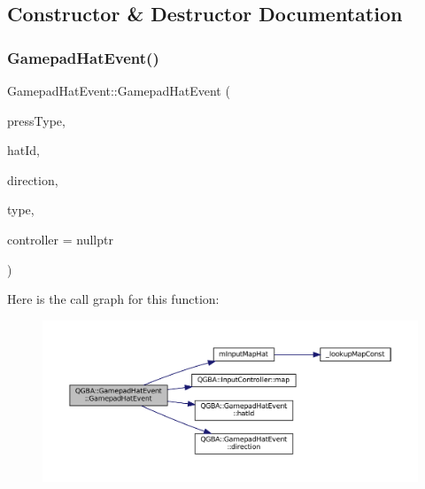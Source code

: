 \subsection{Constructor \& Destructor Documentation}
\mbox{\label{class_q_g_b_a_1_1_gamepad_hat_event_ac940e927086b56db1a2e43b79b18b47e}} 
\subsubsection{\texorpdfstring{Gamepad\+Hat\+Event()}{GamepadHatEvent()}}
{\footnotesize\ttfamily Gamepad\+Hat\+Event\+::\+Gamepad\+Hat\+Event (\begin{DoxyParamCaption}\item[{Type}]{press\+Type,  }\item[{\mbox{\hyperlink{ioapi_8h_a787fa3cf048117ba7123753c1e74fcd6}{int}}}]{hat\+Id,  }\item[{\mbox{\hyperlink{class_q_g_b_a_1_1_gamepad_hat_event_ae3f20662c61b054e5344aafb9d843837}{Direction}}}]{direction,  }\item[{\mbox{\hyperlink{ioapi_8h_a787fa3cf048117ba7123753c1e74fcd6}{int}}}]{type,  }\item[{\mbox{\hyperlink{class_q_g_b_a_1_1_input_controller}{Input\+Controller}} $\ast$}]{controller = {\ttfamily nullptr} }\end{DoxyParamCaption})}

Here is the call graph for this function\+:
\nopagebreak
\begin{figure}[H]
\begin{center}
\leavevmode
\includegraphics[width=350pt]{class_q_g_b_a_1_1_gamepad_hat_event_ac940e927086b56db1a2e43b79b18b47e_cgraph}
\end{center}
\end{figure}


